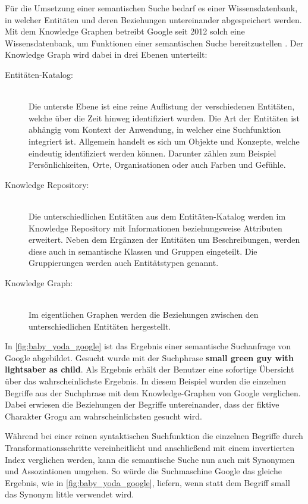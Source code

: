 Für die Umsetzung einer semantischen Suche bedarf es einer Wissensdatenbank, in welcher Entitäten und deren Beziehungen untereinander abgespeichert werden. Mit dem Knowledge Graphen betreibt Google seit 2012 solch eine Wissensdatenbank, um Funktionen einer semantischen Suche bereitzustellen \cite{OlafKopp.2021}. Der Knowledge Graph wird dabei in drei Ebenen unterteilt: \cite{OlafKopp.2021}

\begin{description}
    \item[Entitäten-Katalog:]\hfill \\
    Die unterste Ebene ist eine reine Auflistung der verschiedenen Entitäten, welche über die Zeit hinweg identifiziert wurden. Die Art der Entitäten ist abhängig vom Kontext der Anwendung, in welcher eine Suchfunktion integriert ist. Allgemein handelt es sich um Objekte und Konzepte, welche eindeutig identifiziert werden können. Darunter zählen zum Beispiel Persönlichkeiten, Orte, Organisationen oder auch Farben und Gefühle.
    \item[Knowledge Repository:]\hfill \\
    Die unterschiedlichen Entitäten aus dem Entitäten-Katalog werden im Knowledge Repository mit Informationen beziehungsweise Attributen erweitert. Neben dem Ergänzen der Entitäten um Beschreibungen, werden diese auch in semantische Klassen und Gruppen eingeteilt. Die Gruppierungen werden auch Entitätstypen genannt.
    \item[Knowledge Graph:]\hfill \\
    Im eigentlichen Graphen werden die Beziehungen zwischen den unterschiedlichen Entitäten hergestellt.
\end{description}

In \autoref{fig:baby_yoda_google} ist das Ergebnis einer semantische Suchanfrage von Google abgebildet. Gesucht wurde mit der Suchphrase \glqq \textbf{small green guy with lightsaber as child}\grqq{}. Als Ergebnis erhält der Benutzer eine sofortige Übersicht über das wahrscheinlichste Ergebnis. In diesem Beispiel wurden die einzelnen Begriffe aus der Suchphrase mit dem Knowledge-Graphen von Google verglichen. Dabei erwiesen die Beziehungen der Begriffe untereinander, dass der fiktive Charakter \glqq Grogu\grqq{} am wahrscheinlichsten gesucht wird. 

Während bei einer reinen syntaktischen Suchfunktion die einzelnen Begriffe durch Transformationsschritte vereinheitlicht und anschließend mit einem invertierten Index verglichen werden, kann die semantische Suche nun auch mit Synonymen und Assoziationen umgehen. So würde die Suchmaschine Google das gleiche Ergebnis, wie in \autoref{fig:baby_yoda_google}, liefern, wenn statt dem Begriff \glqq small\grqq{} das Synonym \glqq little\grqq{} verwendet wird.


